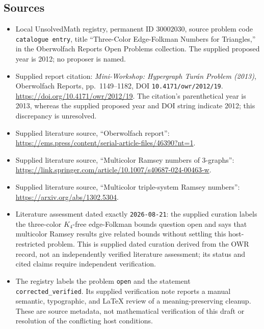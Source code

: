 \documentclass[11pt]{article}
\begin{document}
\subsection{Sources}
\begin{itemize}
\item Local UnsolvedMath registry, permanent ID \(30002030\), source problem code \texttt{catalogue entry}, title ``Three-Color Edge-Folkman Numbers for Triangles,'' in the Oberwolfach Reports Open Problems collection. The supplied proposed year is 2012; no proposer is named.
\item Supplied report citation: \emph{Mini-Workshop: Hypergraph Tur\'an Problem (2013)}, Oberwolfach Reports, pp.~1149--1182, DOI \texttt{10.4171/owr/2012/19}. \url{https://doi.org/10.4171/owr/2012/19}. The citation's parenthetical year is 2013, whereas the supplied proposed year and DOI string indicate 2012; this discrepancy is unresolved.
\item Supplied literature source, ``Oberwolfach report'': \url{https://ems.press/content/serial-article-files/46390?nt=1}.
\item Supplied literature source, ``Multicolor Ramsey numbers of 3-graphs'': \url{https://link.springer.com/article/10.1007/s40687-024-00463-w}.
\item Supplied literature source, ``Multicolor triple-system Ramsey numbers'': \url{https://arxiv.org/abs/1302.5304}.
\item Literature assessment dated exactly \texttt{2026-08-21}: the supplied curation labels the three-color \(K_4\)-free edge-Folkman bounds question open and says that multicolor Ramsey results give related bounds without settling this host-restricted problem. This is supplied dated curation derived from the OWR record, not an independently verified literature assessment; its status and cited claims require independent verification.
\item The registry labels the problem \texttt{open} and the statement \texttt{corrected\_verified}. Its supplied verification note reports a manual semantic, typographic, and LaTeX review of a meaning-preserving cleanup. These are source metadata, not mathematical verification of this draft or resolution of the conflicting host conditions.
\end{itemize}
\end{document}
